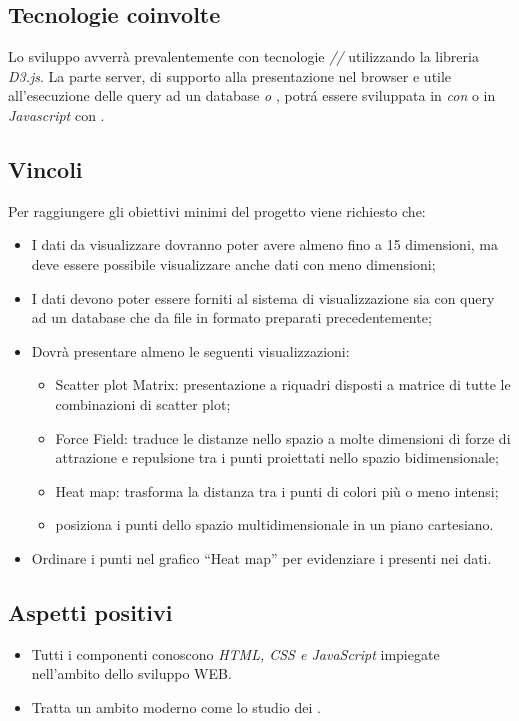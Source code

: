 \subsection{Tecnologie coinvolte}
Lo sviluppo avverrà prevalentemente con tecnologie \textit{//} utilizzando la libreria \textit{D3.js}.
La parte server, di supporto alla presentazione nel browser e utile all'esecuzione delle query ad un database \textit{ o }, potr\'a essere sviluppata in \textit{ con } o in \textit{Javascript} con \textit{}.

\subsection{Vincoli}
Per raggiungere gli obiettivi minimi del progetto viene richiesto che:
\begin{itemize}
	\item I dati da visualizzare dovranno poter avere almeno fino a 15 dimensioni, ma deve essere possibile visualizzare anche dati con meno dimensioni;
	\item I dati devono poter essere forniti al sistema di visualizzazione sia con query ad un database che da file in formato  preparati precedentemente;
	\item Dovrà presentare almeno le seguenti visualizzazioni:
	\begin{itemize}
		\item Scatter plot Matrix: presentazione a riquadri disposti a matrice di tutte le combinazioni di scatter plot;
		\item Force Field: traduce le distanze nello spazio a molte dimensioni di forze di attrazione e repulsione tra i punti proiettati nello spazio bidimensionale;
		\item Heat map: trasforma la distanza tra i punti di colori più o meno intensi;
		\item posiziona i punti dello spazio multidimensionale in un piano
		cartesiano.
	\end{itemize}
	\item Ordinare i punti nel grafico “Heat map” per evidenziare i  presenti nei dati.
\end{itemize}

\subsection{Aspetti positivi}
\begin{itemize}
	\item Tutti i componenti conoscono \textit{HTML, CSS e JavaScript} impiegate nell'ambito dello sviluppo WEB.
	\item Tratta un ambito moderno come lo studio dei .
\end{itemize}


